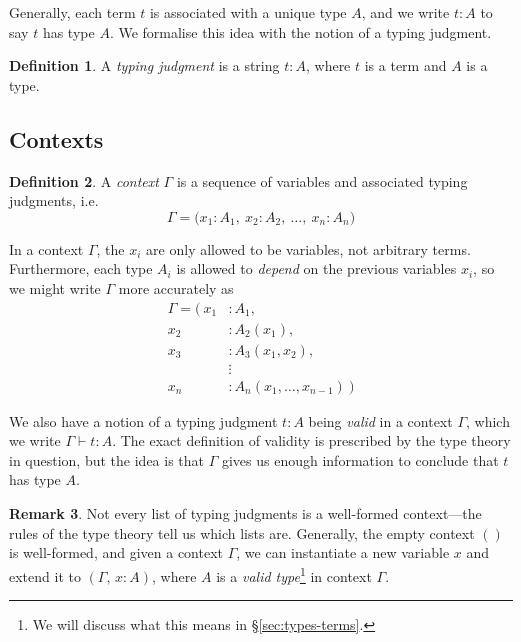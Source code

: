\documentclass{article}
\theoremstyle{definition}
\newtheorem{definition}{Definition}[section]
\newtheorem{remark}[definition]{Remark}
\newcommand{\proves}{\vdash}
\newcommand{\emp}{()}%
\begin{document}
Generally, each term $t$ is associated with a unique type $A$, and we write $t : A$ to say $t$ has type $A$. We formalise this idea with the notion of a typing judgment.

\begin{definition}
    A \textit{typing judgment} is a string $t : A$, where $t$ is a term and $A$ is a type.
\end{definition}


\subsection{Contexts}

\begin{definition}
    A \textit{context} $\Gamma$ is a sequence of variables and associated typing judgments, i.e.
    $$\Gamma = \big( x_1 : A_1,\ x_2 : A_2,\ \ldots,\ x_n : A_n \big)$$
\end{definition}

In a context $\Gamma$, the $x_i$ are only allowed to be variables, not arbitrary terms. Furthermore, each type $A_i$ is allowed to \textit{depend} on the previous variables $x_i$, so we might write $\Gamma$ more accurately as
\begin{align*}
    \Gamma = \big(\
    x_1 &: A_1,\\
    x_2 &: A_2(x_1),\\
    x_3 &: A_3(x_1,x_2),\\
    &\mathrel{\vdots}\\
    x_n &: A_n(x_1,\ldots,x_{n-1})\ \big)
\end{align*}

We also have a notion of a typing judgment $t : A$ being \textit{valid} in a context $\Gamma$, which we write $\Gamma \proves t : A$. The exact definition of validity is prescribed by the type theory in question, but the idea is that $\Gamma$ gives us enough information to conclude that $t$ has type $A$.

\begin{remark}
    Not every list of typing judgments is a well-formed context---the rules of the type theory tell us which lists are. Generally, the empty context $\emp$ is well-formed, and given a context $\Gamma$, we can instantiate a new variable $x$ and extend it to $( \Gamma,\, x : A )$, where $A$ is a \textit{valid type}\footnote{We will discuss what this means in \S\ref{sec:types-terms}.} in context $\Gamma$.
\end{remark}
\end{document}
